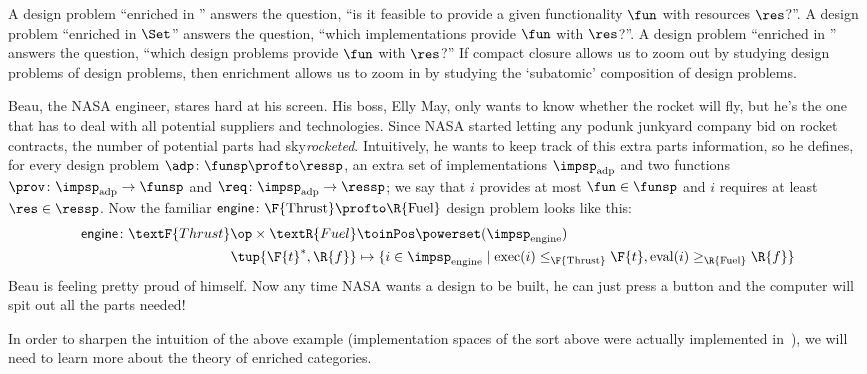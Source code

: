 \label{sec:enriched}
A design problem ``enriched in \Bool'' answers the question, ``is it feasible to provide a given functionality $\fun$ with resources $\res$?''. A design problem ``enriched in $\Set$'' answers the question, ``which implementations provide $\fun$ with $\res$?''. A design problem ``enriched in \DP'' answers the question, ``which design problems provide $\fun$ with $\res$?'' If compact closure allows us to zoom out by studying design problems of design problems, then enrichment allows us to zoom in by studying the `subatomic' composition of design problems.

\begin{example}
  \label{ex:dpi_example}
  Beau, the NASA engineer, stares hard at his screen. His boss, Elly May, only wants to know whether the rocket will fly, but he's the one that has to deal with all potential suppliers and technologies. Since NASA started letting any podunk junkyard company bid on rocket contracts, the number of potential parts had sky\emph{rocketed}. Intuitively, he wants to keep track of this extra parts information, so he defines, for every design problem $\adp \colon \funsp \profto \ressp$, an extra set of implementations $\impsp_\text{adp}$ and two functions $\prov\colon \impsp_\text{adp} \to \funsp$ and  $\req\colon \impsp_\text{adp} \to \ressp$; we say that $i$ provides at most $\fun \in \funsp$ and $i$ requires at least $\res \in \ressp$. Now the familiar $\mathsf{engine} \colon \F{\text{Thrust}} \profto \R{\text{Fuel}}$ design problem looks like this:
  \begin{equation}
    \begin{aligned}
      \mathsf{engine} \colon \textF{Thrust}\op \times \textR{Fuel} &\toinPos \powerset(\impsp_\text{engine}) \\
      \tup{\F{t}^*,\R{f}} &\mapsto \{ i \in \impsp_\text{engine} \mid \text{exec}(i) \leq_\F{\text{Thrust}} \F{t}, \text{eval}(i) \geq_\R{\text{Fuel}} \R{f} \}
    \end{aligned}
  \end{equation}
  Beau is feeling pretty proud of himself. Now any time NASA wants a design to be built, he can just press a button and the computer will spit out all the parts needed!
\end{example}

In order to sharpen the intuition of the above example (implementation spaces of the sort above were actually implemented in~\cite{censi}), we will need to learn more about the theory of enriched categories.

